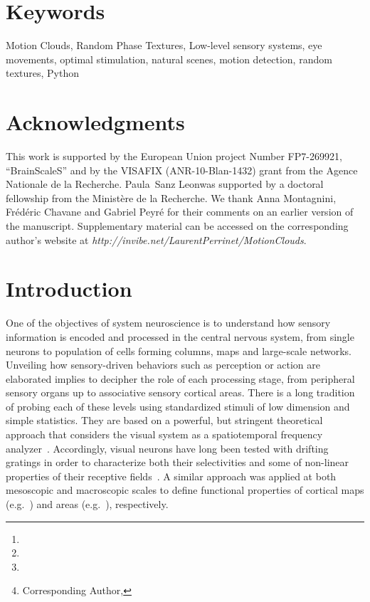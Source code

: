 \documentclass[a4paper,11pt]{article}%
\title{\Title}%
\author[1,2]{\AuthorA \thanks{\EmailA}}
\author[1,2]{\AuthorB \thanks{\EmailB}}
\author[1,2]{\AuthorC \thanks{\EmailC}}
\author[1,2]{\AuthorD \thanks{Corresponding Author, \EmailD}}%
\affil[1]{\AddressA}
\affil[2]{\AddressB}
\date{}%
\newcommand{\AuthorA}{Paula~Sanz Leon}%
\newcommand{\Website}{http://invibe.net/LaurentPerrinet}%
\newcommand{\Abstract}{%
Choosing an appropriate set of stimuli is essential in order to characterize the response of a sensory system to a particular functional dimension, such as the eye movement following the motion of a visual scene. %
Here, we describe a framework to generate random texture movies with controlled information content, i.e., Motion Clouds. These stimuli are defined using a generative model which is based on controlled experimental parametrization. %
We show that Motion Clouds correspond to dense mixing of localized moving gratings with random positions. Their global envelope is similar to natural-like stimulation with an approximate full-field translation corresponding to a retinal slip. %
We describe the construction of these stimuli mathematically and propose an open-source python-based implementation. %
Examples of the use of this framework are shown. We also propose extensions to other modalities such as color vision, touch and audition.%
}%
\newcommand{\Keywords}%
{Motion Clouds, Random Phase Textures, Low-level sensory systems, eye movements, optimal stimulation, natural scenes, motion detection, random textures, Python}
\newcommand{\Acknowledgments}{%
This work is supported by the European Union project Number FP7-269921, ``BrainScaleS'' and by the VISAFIX (ANR-10-Blan-1432)  grant from the Agence Nationale de la Recherche. \AuthorA was supported by a doctoral fellowship from the Minist{\`e}re de la Recherche. We thank Anna Montagnini, Fr\'ed\'eric Chavane and Gabriel Peyr\'e for their comments on an earlier version of the manuscript. Supplementary material can be accessed on the corresponding author's website at \textit{\Website/MotionClouds}.}%
\begin{document}
\maketitle
\begin{abstract}
\Abstract
\end{abstract}%
\section*{Keywords}
\Keywords
\section*{Acknowledgments}
\Acknowledgments
\section{Introduction }\label{intro}

One of the objectives of system neuroscience is to understand how sensory information is encoded and processed in the central nervous system, from single neurons to population of cells forming columns, maps and large-scale networks. Unveiling how sensory-driven behaviors such as perception or action are elaborated implies to decipher the role of each processing stage, from peripheral sensory organs up to associative sensory cortical areas. There is a long tradition of probing each of these levels using standardized stimuli of low dimension and simple statistics. They are based on a powerful, but stringent theoretical approach that considers the visual system as a spatiotemporal frequency analyzer~\citep{Graham79,Watson83}. Accordingly, visual neurons have long been tested with drifting gratings in order to characterize both their selectivities and some of non-linear properties of their receptive fields~\citep{DeValois1988Spatial}. A similar approach was applied at both mesoscopic and macroscopic scales to define functional properties of cortical maps (e.g.~\citep{Blasdel86,TsO90}) and areas (e.g.~\citep{Singh2000Spatiotemporal,Henriksson08}), respectively.  
\end{document}
